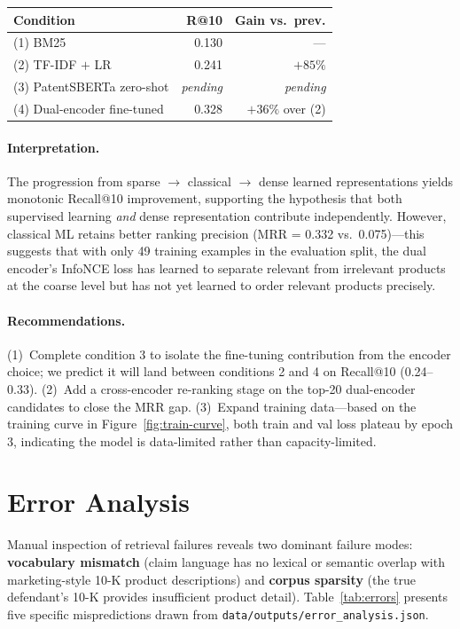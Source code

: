 \documentclass[11pt]{article}
\begin{document}
\begin{center}
\begin{tabular}{lrr}
\toprule
\textbf{Condition} & \textbf{R@10} & \textbf{Gain vs.\ prev.} \\
\midrule
(1) BM25 & 0.130 & --- \\
(2) TF-IDF $+$ LR & 0.241 & $+85\%$ \\
(3) PatentSBERTa zero-shot & \emph{pending} & \emph{pending} \\
(4) Dual-encoder fine-tuned & 0.328 & $+36\%$ over (2) \\
\bottomrule
\end{tabular}
\end{center}

\paragraph{Interpretation.} The progression from sparse $\to$ classical $\to$ dense learned representations yields monotonic Recall@10 improvement, supporting the hypothesis that both supervised learning \emph{and} dense representation contribute independently. However, classical ML retains better ranking precision (MRR = 0.332 vs.\ 0.075)---this suggests that with only 49 training examples in the evaluation split, the dual encoder's InfoNCE loss has learned to separate relevant from irrelevant products at the coarse level but has not yet learned to order relevant products precisely.

\paragraph{Recommendations.} (1)~Complete condition 3 to isolate the fine-tuning contribution from the encoder choice; we predict it will land between conditions 2 and 4 on Recall@10 (0.24--0.33). (2)~Add a cross-encoder re-ranking stage on the top-20 dual-encoder candidates to close the MRR gap. (3)~Expand training data---based on the training curve in Figure~\ref{fig:train-curve}, both train and val loss plateau by epoch 3, indicating the model is data-limited rather than capacity-limited.

\section{Error Analysis}

Manual inspection of retrieval failures reveals two dominant failure modes: \textbf{vocabulary mismatch} (claim language has no lexical or semantic overlap with marketing-style 10-K product descriptions) and \textbf{corpus sparsity} (the true defendant's 10-K provides insufficient product detail). Table~\ref{tab:errors} presents five specific mispredictions drawn from \texttt{data/outputs/error\_analysis.json}.
\end{document}
